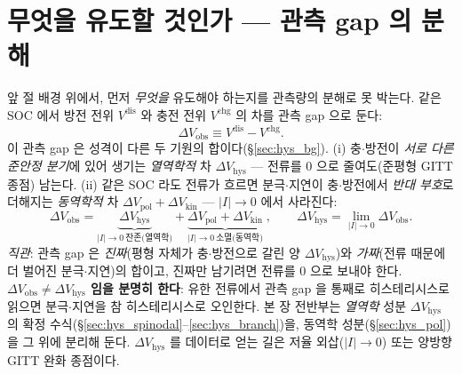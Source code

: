 \documentclass[11pt,a4paper]{article}
\newcommand{\dis}{\mathrm{dis}}
\newcommand{\chg}{\mathrm{chg}}
\newcommand{\hys}{\mathrm{hys}}
\newcommand{\pol}{\mathrm{pol}}
\newcommand{\kin}{\mathrm{kin}}
\newcommand{\obs}{\mathrm{obs}}
\begin{document}
\section{무엇을 유도할 것인가 — 관측 gap 의 분해}\label{sec:hys_decomp}
앞 절 배경 위에서, 먼저 \emph{무엇을} 유도해야 하는지를 관측량의 분해로 못 박는다. 같은 SOC 에서 방전 전위
$V^\dis$ 와 충전 전위 $V^\chg$ 의 차를 관측 gap 으로 둔다:
\begin{equation}
\Delta V_\obs\equiv V^\dis-V^\chg.
\label{eq:hys_obs}
\end{equation}
이 관측 gap 은 성격이 다른 두 기원의 합이다(\S\ref{sec:hys_bg}). (i) 충$\cdot$방전이 \emph{서로 다른 준안정
분기}에 있어 생기는 \emph{열역학적} 차 $\Delta V_\hys$ — 전류를 $0$ 으로 줄여도(준평형 GITT 종점) 남는다. (ii)
같은 SOC 라도 전류가 흐르면 분극$\cdot$지연이 충$\cdot$방전에서 \emph{반대 부호}로 더해지는 \emph{동역학적} 차
$\Delta V_\pol+\Delta V_\kin$ — $|I|\to0$ 에서 사라진다:
\begin{equation}
\boxed{\;\Delta V_\obs=\underbrace{\Delta V_\hys}_{|I|\to0\ \text{잔존(열역학)}}
+\underbrace{\Delta V_\pol+\Delta V_\kin}_{|I|\to0\ \text{소멸(동역학)}}\;,\qquad
\Delta V_\hys=\lim_{|I|\to0}\Delta V_\obs.\;}
\label{eq:hys_split}
\end{equation}
\emph{직관}: 관측 gap 은 \emph{진짜}(평형 자체가 충$\cdot$방전으로 갈린 양 $\Delta V_\hys$)와 \emph{가짜}(전류
때문에 더 벌어진 분극$\cdot$지연)의 합이고, 진짜만 남기려면 전류를 $0$ 으로 보내야 한다.
\textbf{$\Delta V_\obs\ne\Delta V_\hys$ 임을 분명히 한다}: 유한 전류에서 관측 gap 을 통째로 히스테리시스로
읽으면 분극$\cdot$지연을 참 히스테리시스로 오인한다. 본 장 전반부는 \emph{열역학} 성분 $\Delta V_\hys$ 의 확정
수식(\S\ref{sec:hys_spinodal}--\ref{sec:hys_branch})을, 동역학 성분(\S\ref{sec:hys_pol})을 그 위에 분리해
둔다. $\Delta V_\hys$ 를 데이터로 얻는 길은 저율 외삽($|I|\to0$) 또는 양방향 GITT 완화 종점이다.

\end{document}
